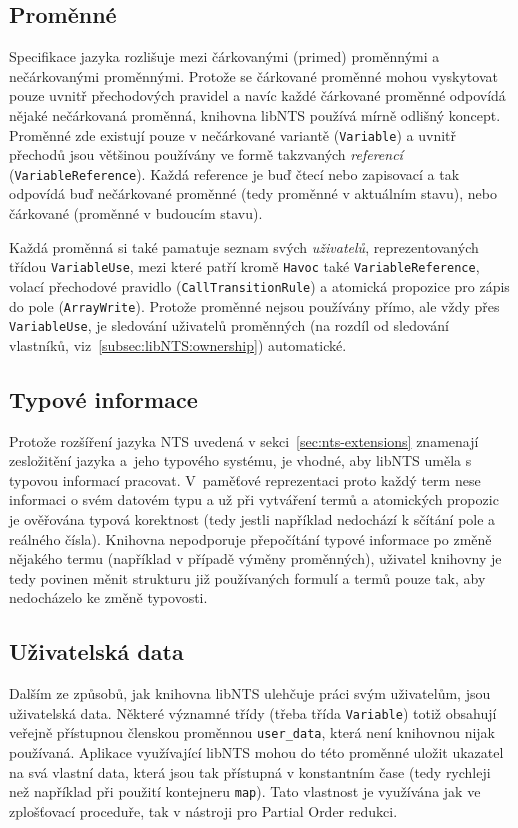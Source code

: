 \documentclass[12pt]{fithesis2}
\begin{document}
\subsection{Proměnné}
Specifikace jazyka rozlišuje mezi čárkovanými (primed) proměnnými a nečárkovanými proměnnými. Protože se čárkované proměnné mohou vyskytovat pouze uvnitř přechodových pravidel a navíc každé čárkované proměnné odpovídá nějaké nečárkovaná proměnná, knihovna libNTS používá mírně odlišný koncept. Proměnné zde existují pouze v nečárkované variantě (\texttt{Variable}) a uvnitř přechodů jsou většinou používány ve formě takzvaných \textit{referencí} (\texttt{VariableReference}). Každá reference je buď čtecí nebo zapisovací a tak odpovídá buď nečárkované proměnné (tedy proměnné v aktuálním stavu), nebo čárkované (proměnné v budoucím stavu).

\label{subsec:libNTS:variable:use}
Každá proměnná si také pamatuje seznam svých \textit{uživatelů}, reprezentovaných třídou \texttt{VariableUse}, mezi které patří kromě \texttt{Havoc} také \texttt{VariableReference}, volací přechodové pravidlo (\texttt{CallTransitionRule}) a atomická propozice pro zápis do pole (\texttt{ArrayWrite}). Protože proměnné nejsou používány přímo, ale vždy přes \texttt{VariableUse}, je sledování uživatelů proměnných (na rozdíl od sledování vlastníků, viz~\ref{subsec:libNTS:ownership}) automatické.

\subsection{Typové informace}
Protože rozšíření jazyka NTS uvedená v sekci~\ref{sec:nts-extensions} znamenají zesložitění jazyka a~jeho typového systému, je vhodné, aby libNTS uměla s typovou informací pracovat. V~paměťové reprezentaci proto každý term nese informaci o svém datovém typu a už při vytváření termů a atomických propozic je ověřována typová korektnost (tedy jestli například nedochází k sčítání pole a reálného čísla). Knihovna nepodporuje přepočítání typové informace po změně nějakého termu (například v případě výměny proměnných), uživatel knihovny je tedy povinen měnit strukturu již používaných formulí a termů pouze tak, aby nedocházelo ke změně typovosti.

\subsection{Uživatelská data}
Dalším ze způsobů, jak knihovna libNTS ulehčuje práci svým uživatelům, jsou uživatelská data. Některé významné třídy (třeba třída \texttt{Variable}) totiž obsahují veřejně přístupnou členskou proměnnou \texttt{user\_data}, která není knihovnou nijak používaná. Aplikace využívající libNTS mohou do této proměnné  uložit ukazatel na svá vlastní data, která jsou tak přístupná v konstantním čase (tedy rychleji než například při použití kontejneru \texttt{map}). Tato vlastnost je využívána jak ve zplošťovací proceduře, tak v nástroji pro Partial Order redukci.
\end{document}
